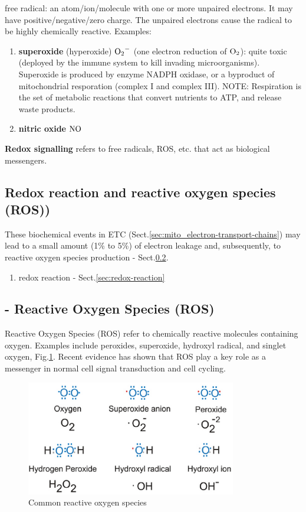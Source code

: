 free radical: an atom/ion/molecule with one or more unpaired electrons.
  It may have positive/negative/zero charge. The unpaired electrons cause the radical to be
  highly chemically reactive. Examples:
  \begin{enumerate}
    \item {\bf superoxide} (hyperoxide) $\ce{O2^-}$
  (one electron reduction of $\ce{O2}$): quite toxic (deployed by the immune
  system to kill invading microorganisms). Superoxide is produced by enzyme
  NADPH oxidase, or a byproduct of mitochondrial resporation (complex I and
  complex III). NOTE: Respiration is the set of metabolic reactions that convert
  nutrients to ATP, and release waste products.
  \item {\bf nitric oxide} $\ce{NO}$

  \end{enumerate}


{\bf Redox signalling} refers to free radicals, ROS, etc. that act as biological
messengers.


\subsection{Redox reaction and reactive oxygen species (ROS))}
\label{sec:redox_reaction_ROS}

These biochemical events in ETC
(Sect.\ref{sec:mito_electron-transport-chains}) may lead to a small amount (1\%
to 5\%) of electron leakage and, subsequently, to reactive oxygen species
production - Sect.\ref{sec:ROS}.

\begin{enumerate}
  \item redox reaction - Sect.\ref{sec:redox-reaction}
\end{enumerate}

\subsection{- Reactive Oxygen Species (ROS)}
\label{sec:ROS}

Reactive Oxygen Species (ROS) refer to chemically reactive molecules containing
oxygen. Examples include peroxides, superoxide, hydroxyl radical, and singlet
oxygen, Fig.\ref{fig:ROS}. Recent evidence has shown that ROS play a key role as
a messenger in normal cell signal transduction and cell cycling.

\begin{figure}[hbt]
  \centerline{\includegraphics[height=5cm,
    angle=0]{./images/ROS.eps}}
\caption{Common reactive oxygen species}
\label{fig:ROS}
\end{figure}


